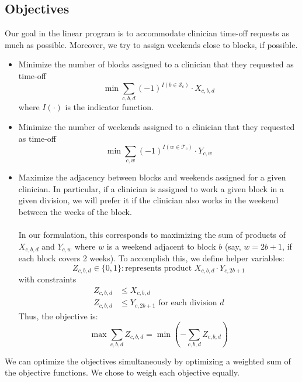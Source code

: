 \documentclass[]{article}
\newcommand{\mc}{\mathcal}
\begin{document}
\subsection{Objectives} \label{objectives}
Our goal in the linear program is to accommodate clinician time-off requests as much as possible. Moreover, we try to assign weekends close to blocks, if possible.
	\begin{itemize}
		\item Minimize the number of blocks assigned to a clinician that they requested as time-off
			\begin{equation}
				\label{eqn_block_obj}
				\min \sum_{c, b, d} (-1)^{ I(b \in \mc{S}_c) } \cdot X_{c, b, d}
			\end{equation}
		where $I(\cdot)$ is the indicator function.
		\item Minimize the number of weekends assigned to a clinician that they requested as time-off
			\begin{equation}
				\label{eqn_weekend_obj}
				\min \sum_{c, w} (-1)^{ I (w \in \mc{T}_c)} \cdot Y_{c, w}
			\end{equation}
		\item Maximize the adjacency between blocks and weekends assigned for a given clinician. In particular, if a clinician is assigned to work a given block in a given division, we will prefer it if the clinician also works in the weekend between the weeks of the block. \\ \\
		In our formulation, this corresponds to maximizing the sum of products of $X_{c, b, d}$ and $Y_{c, w}$ where $w$ is a weekend adjacent to block $b$ (say, $w = 2b+1$, if each block covers 2 weeks). To accomplish this, we define helper variables:
			\begin{equation}
				Z_{c, b, d} \in \{0, 1\} : \text{represents product $X_{c, b, d}\cdot Y_{c, 2b+1}$}
			\end{equation}
		with constraints
			\begin{align}
				Z_{c, b, d} &\leq X_{c, b, d} \\
				Z_{c, b, d} &\leq Y_{c, 2b+1} \text{ for each division $d$}
			\end{align}
		Thus, the objective is:
			\begin{equation}
				\label{eqn_adjacency_obj}
				\max \sum_{c, b, d} Z_{c, b, d} = \min \left(- \sum_{c, b, d} Z_{c, b, d}\right)
			\end{equation}
	\end{itemize}	

We can optimize the objectives simultaneously by optimizing a weighted sum of the objective functions. We chose to weigh each objective equally.
\end{document}
